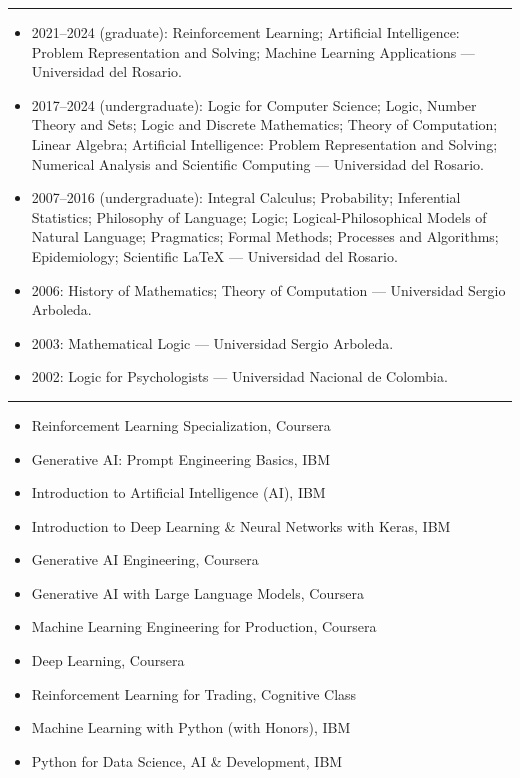 \documentclass[10pt]{article}
\newcommand{\cvsection}[1]{%
  \par\vspace{0.55em}%
  \noindent{\sffamily\bfseries\MakeUppercase{#1}}\par
  \vspace{-0.35em}%
  \noindent\rule{\textwidth}{0.4pt}\par
  \vspace{0.2em}%
}
\begin{document}
\cvsection{Courses Taught}
\begin{itemize}
  \item 2021--2024 (graduate): Reinforcement Learning; Artificial Intelligence: Problem Representation and Solving; Machine Learning Applications --- Universidad del Rosario.
  \item 2017--2024 (undergraduate): Logic for Computer Science; Logic, Number Theory and Sets; Logic and Discrete Mathematics; Theory of Computation; Linear Algebra; Artificial Intelligence: Problem Representation and Solving; Numerical Analysis and Scientific Computing --- Universidad del Rosario.
  \item 2007--2016 (undergraduate): Integral Calculus; Probability; Inferential Statistics; Philosophy of Language; Logic; Logical-Philosophical Models of Natural Language; Pragmatics; Formal Methods; Processes and Algorithms; Epidemiology; Scientific LaTeX --- Universidad del Rosario.
  \item 2006: History of Mathematics; Theory of Computation --- Universidad Sergio Arboleda.
  \item 2003: Mathematical Logic --- Universidad Sergio Arboleda.
  \item 2002: Logic for Psychologists --- Universidad Nacional de Colombia.
\end{itemize}

\cvsection{Certifications}
\begin{itemize}
  \item Reinforcement Learning Specialization, Coursera
  \item Generative AI: Prompt Engineering Basics, IBM
  \item Introduction to Artificial Intelligence (AI), IBM
  \item Introduction to Deep Learning \& Neural Networks with Keras, IBM
  \item Generative AI Engineering, Coursera
  \item Generative AI with Large Language Models, Coursera
  \item Machine Learning Engineering for Production, Coursera
  \item Deep Learning, Coursera
  \item Reinforcement Learning for Trading, Cognitive Class
  \item Machine Learning with Python (with Honors), IBM
  \item Python for Data Science, AI \& Development, IBM
\end{itemize}
\end{document}
